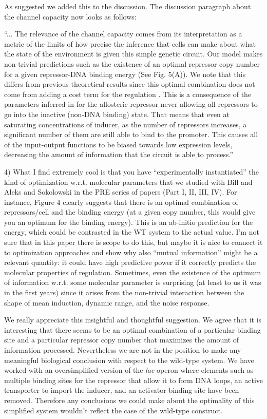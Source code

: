 As suggested we added this to the discussion. The discussion paragraph about the
channel capacity now looks as follows:

``... The relevance of the channel capacity comes from its interpretation as a
metric of the limits of how precise the inference that cells can make about what
the state of the environment is given this simple genetic circuit. Our model
makes non-trivial predictions such as the existence of an optimal repressor copy
number for a given repressor-DNA binding energy (See Fig. 5(A)). We
note that this differs from previous theoretical results since this optimal
combination does not come from adding a cost term for the regulation
\cite{Tkacik2011}. This is a consequence of the parameters inferred in
\cite{Razo-Mejia2018} for the allosteric repressor never allowing all repressors
to go into the inactive (non-DNA binding) state. That means that even at
saturating concentrations of inducer, as the number of repressors increases, a
significant number of them are still able to bind to the promoter. This causes
all of the input-output functions to be biased towards low expression levels,
decreasing the amount of information that the circuit is able to process.''

\begin{tcolorbox}
4) What I find extremely cool is that you have “experimentally instantiated” the
kind of optimization w.r.t. molecular parameters that we studied with Bill and
Aleks and Sokolowski in the PRE series of papers (Part I, II, III, IV). For
instance, Figure 4 clearly suggests that there is an optimal combination of
repressors/cell and the binding energy (at a given copy number, this would give
you an optimum for the binding energy). This is an ab-initio prediction for the
energy, which could be contrasted in the WT system to the actual value. I’m not
sure that in this paper there is scope to do this, but maybe it is nice to
connect it to optimization approaches and show why also “mutual information”
might be a relevant quantity: it could have high predictive power if it
correctly predicts the molecular properties of regulation. Sometimes, even the
existence of the optimum of information w.r.t. some molecular parameter is
surprising (at least to us it was in the first years) since it arises from the
non-trivial interaction between the shape of mean induction, dynamic range, and
the noise response.
\end{tcolorbox}

We really appreciate this insightful and thoughtful suggestion. We agree that it
is interesting that there seems to be an optimal combination of a particular
binding site and a particular repressor copy number that maximizes the amount of
information processed. Nevertheless we are not in the position to make any
meaningful biological conclusion with respect to the wild-type system. We have
worked with an oversimplified version of the {\it lac} operon where elements
such as multiple binding sites for the repressor that allow it to form DNA
loops, an active transporter to import the inducer, and an activator binding
site have been removed. Therefore any conclusions we could make about the
optimality of this simplified system wouldn't reflect the case of the wild-type
construct.

